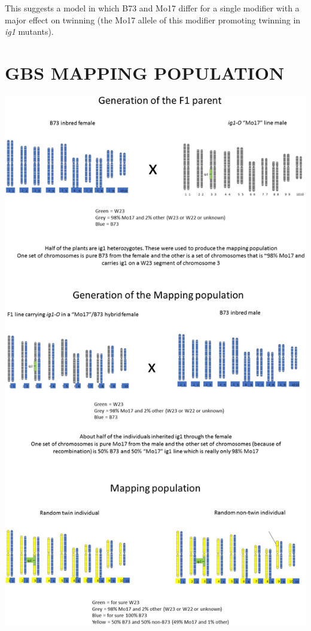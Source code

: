 \documentclass[maize,portrait]{a0poster}
\newlength{\figwidth}
\begin{document}
\begin{multicols}{3}
  This suggests a model in which B73 and Mo17 differ for a single modifier with a major
  effect on twinning (the Mo17 allele of this modifier promoting twinning in \textit{ig1} mutants).

  \section*{GBS MAPPING POPULATION}
  \includegraphics[width=\figwidth]{twin-study-mapping.png}
  

\end{multicols}
\end{document}
